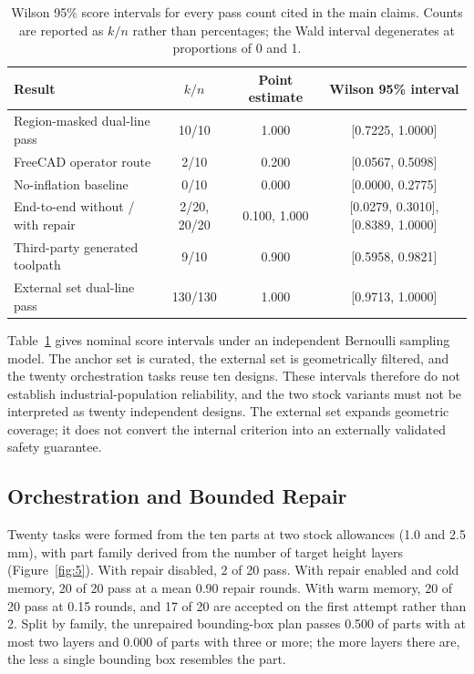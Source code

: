\begin{table}[htbp]\small
\caption{Wilson 95\% score intervals for every pass count cited in the main claims. Counts are reported as $k/n$ rather than percentages; the Wald interval degenerates at proportions of 0 and 1.}
\centering
\begin{tabular}{lccc}
\toprule
Result & $k/n$ & Point estimate & Wilson 95\% interval \\
\midrule
Region-masked dual-line pass & 10/10 & 1.000 & [0.7225, 1.0000] \\
FreeCAD operator route & 2/10 & 0.200 & [0.0567, 0.5098] \\
No-inflation baseline & 0/10 & 0.000 & [0.0000, 0.2775] \\
End-to-end without / with repair & 2/20, 20/20 & 0.100, 1.000 & [0.0279, 0.3010], [0.8389, 1.0000] \\
Third-party generated toolpath & 9/10 & 0.900 & [0.5958, 0.9821] \\
External set dual-line pass & 130/130 & 1.000 & [0.9713, 1.0000] \\
\bottomrule
\end{tabular}
\label{tab:2}
\end{table}

Table~\ref{tab:2} gives nominal score intervals under an independent Bernoulli sampling model. The anchor set is curated, the external set is geometrically filtered, and the twenty orchestration tasks reuse ten designs. These intervals therefore do not establish industrial-population reliability, and the two stock variants must not be interpreted as twenty independent designs. The external set expands geometric coverage; it does not convert the internal criterion into an externally validated safety guarantee.

\subsection{Orchestration and Bounded Repair}

Twenty tasks were formed from the ten parts at two stock allowances (1.0 and 2.5 mm), with part family derived from the number of target height layers (Figure~\ref{fig:5}). With repair disabled, 2 of 20 pass. With repair enabled and cold memory, 20 of 20 pass at a mean 0.90 repair rounds. With warm memory, 20 of 20 pass at 0.15 rounds, and 17 of 20 are accepted on the first attempt rather than 2. Split by family, the unrepaired bounding-box plan passes 0.500 of parts with at most two layers and 0.000 of parts with three or more; the more layers there are, the less a single bounding box resembles the part.

